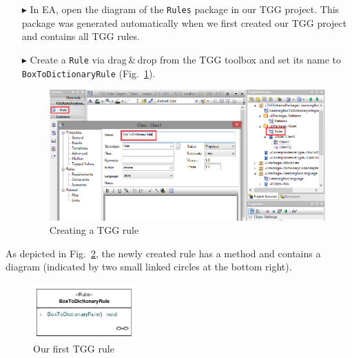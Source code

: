 \begin{enumerate}
\item[$\blacktriangleright$] In EA, open the diagram of the \texttt{Rules} package in our TGG project.
This package was generated automatically when we first created our TGG project and contains all TGG rules.

\item[$\blacktriangleright$] Create a \texttt{Rule} via drag\,\&\,drop from the TGG toolbox and set its name to \texttt{BoxToDictionaryRule} (Fig.~\ref{fig:create_tgg_rule}).

\begin{figure}[htbp]
\begin{center}
  \includegraphics[width=\textwidth]{pics/tggBilder/tggRule/tgg8}
  \caption{Creating a TGG rule}
  \label{fig:create_tgg_rule}
\end{center}
\end{figure}

\end{enumerate}

As depicted in Fig.~\ref{fig:first_tgg_rule}, the newly created rule has a method and contains a diagram (indicated by two small linked circles at the bottom right).

\begin{figure}[htbp]
\begin{center}
  \includegraphics[width=0.35\textwidth]{pics/tggBilder/tggRule/tgg9}
  \caption{Our first TGG rule}
  \label{fig:first_tgg_rule}
\end{center}
\end{figure}

